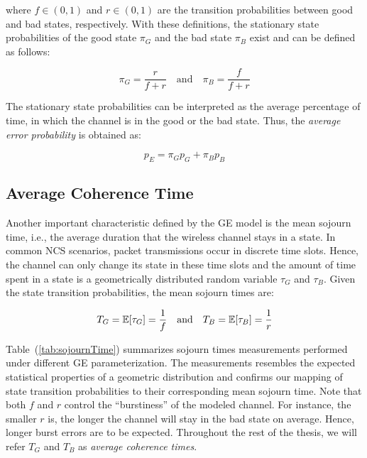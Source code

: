 where $f\in(0,1)$ and $r\in(0,1)$ are the transition probabilities between good
and bad states, respectively. With these definitions, the stationary state
probabilities of the good state $\pi_G$ and the bad state $\pi_B$ exist and can
be defined as follows:

\begin{equation}
  \pi_G = \frac{r}{f+r} \quad \textrm{and} \quad \pi_B = \frac{f}{f+r}
\end{equation}

The stationary state probabilities can be interpreted as the average percentage
of time, in which the channel is in the good or the bad state. Thus, the
\textit{average error probability} is obtained as:

\begin{equation}
  p_E = \pi_G p_G + \pi_B p_B
  \label{eq:avgLoss}
\end{equation}

\subsection{Average Coherence Time}
Another important characteristic defined by the GE model is the mean sojourn
time, i.e., the average duration that the wireless channel stays in a state. In
common NCS scenarios, packet transmissions occur in discrete time slots. Hence,
the channel can only change its state in these time slots and the amount of time
spent in a state is a geometrically distributed random variable $\tau_G$ and
$\tau_B$. Given the state transition probabilities, the mean sojourn times are:

\begin{equation}
  T_G = \mathbb{E}[\tau_G] = \frac{1}{f} \quad \textrm{and} \quad T_B = \mathbb{E}[\tau_B] = \frac{1}{r}
\end{equation}

Table~(\ref{tab:sojournTime}) summarizes sojourn times measurements performed
under different GE parameterization. The measurements resembles the expected
statistical properties of a geometric distribution and confirms our mapping of
state transition probabilities to their corresponding mean sojourn time. Note
that both $f$ and $r$ control the ``burstiness'' of the modeled channel. For
instance, the smaller $r$ is, the longer the channel will stay in the bad state
on average. Hence, longer burst errors are to be expected. Throughout the rest
of the thesis, we will refer $T_G$ and $T_B$ as \textit{average coherence
times}.


